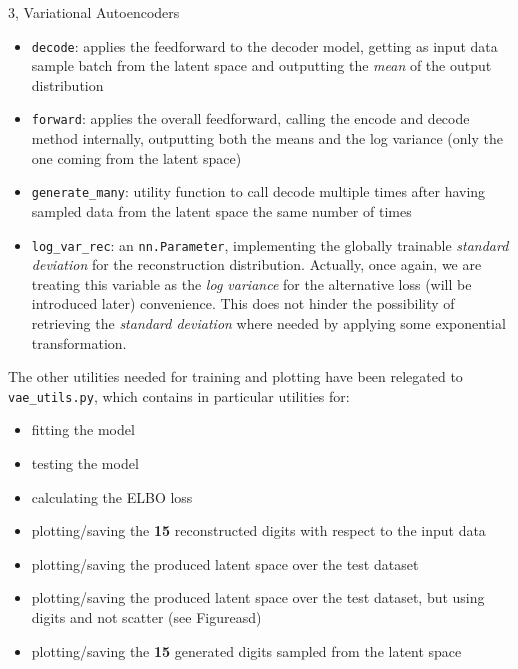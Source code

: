 \documentclass[10pt,a4paper]{article}
\begin{document}
\begin{task}{3, Variational Autoencoders}
\begin{itemize}
    \item \texttt{decode}: applies the feedforward to the decoder model, getting as input data sample batch from the latent space and outputting the \textit{mean} of the output distribution
    \item \texttt{forward}: applies the overall feedforward, calling the encode and decode method internally, outputting both the means and the log variance (only the one coming from the latent space)
    \item \texttt{generate\_many}: utility function to call decode multiple times after having sampled data from the latent space the same number of times
    \item \texttt{log\_var\_rec}: an \texttt{nn.Parameter}, implementing the globally trainable \textit{standard deviation} for the reconstruction distribution. Actually, once again, we are treating this variable as the \textit{log variance} for the alternative loss (will be introduced later) convenience. This does not hinder the possibility of retrieving the \textit{standard deviation} where needed by applying some exponential transformation.
\end{itemize}

The other utilities needed for training and plotting have been relegated to \texttt{vae\_utils.py}, which contains in particular utilities for:
\begin{itemize}
    \item fitting the model
    \item testing the model
    \item calculating the ELBO loss
    \item plotting/saving the \textbf{15} reconstructed digits with respect to the input data
    \item plotting/saving the produced latent space over the test dataset
    \item plotting/saving the produced latent space over the test dataset, but using digits and not scatter (see Figureasd)
    \item plotting/saving the \textbf{15} generated digits sampled from the latent space
\end{itemize}


\end{task}
\end{document}
